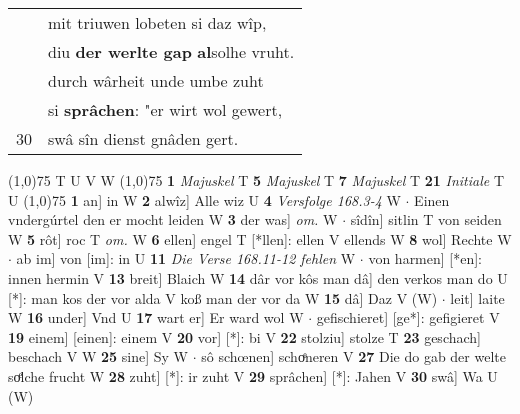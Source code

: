 \documentclass[8pt,a4paper,notitlepage]{article}
\begin{document}
\begin{table}[ht]
\begin{minipage}[t]{0.5\linewidth}
\begin{tabular}{rl}
 & mit triuwen lobeten si daz wîp,\\ 
 & diu \textbf{der werlte gap} \textbf{al}solhe vruht.\\ 
 & durch wârheit unde umbe zuht\\ 
 & si \textbf{sprâchen}: "er wirt wol gewert,\\ 
30 & swâ sîn dienst gnâden gert.\\ 
\end{tabular}
\scriptsize
\line(1,0){75} \newline
T U V W \newline
\line(1,0){75} \newline
\textbf{1} \textit{Majuskel} T  \textbf{5} \textit{Majuskel} T  \textbf{7} \textit{Majuskel} T  \textbf{21} \textit{Initiale} T U  \newline
\line(1,0){75} \newline
\textbf{1} an] in W \textbf{2} alwîz] Alle wiz U \textbf{4} \textit{Versfolge 168.3-4} W   $\cdot$ Einen vndergúrtel den er mocht leiden W \textbf{3} der was] \textit{om.} W  $\cdot$ sîdîn] sitlin T von seiden W \textbf{5} rôt] roc T \textit{om.} W \textbf{6} ellen] engel T [*llen]: ellen V ellends W \textbf{8} wol] Rechte W  $\cdot$ ab im] von [im]: in U \textbf{11} \textit{Die Verse 168.11-12 fehlen} W   $\cdot$ von harmen] [*en]: innen hermin V \textbf{13} breit] Blaich W \textbf{14} dâr vor kôs man dâ] den verkos man do U [*]: man kos der vor alda V koß man der vor da W \textbf{15} dâ] Daz V (W)  $\cdot$ leit] laite W \textbf{16} under] Vnd U \textbf{17} wart er] Er ward wol W  $\cdot$ gefischieret] [ge*]: gefigieret V \textbf{19} einem] [einen]: einem V \textbf{20} vor] [*]: bi V \textbf{22} stolziu] stolze T \textbf{23} geschach] beschach V W \textbf{25} sine] Sy W  $\cdot$ sô schœnen] schoͤneren V \textbf{27} Die do gab der welte soͤlche frucht W \textbf{28} zuht] [*]: ir zuht V \textbf{29} sprâchen] [*]: Jahen V \textbf{30} swâ] Wa U (W) \newline
\end{minipage}
\end{table}
\end{document}
